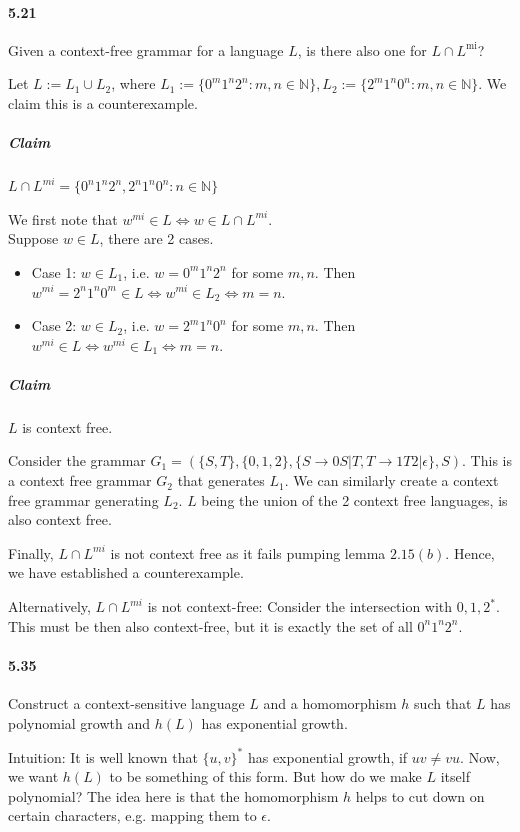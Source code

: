 \documentclass{article}
\begin{document}
\paragraph{5.21} Given a context-free grammar for a language $L$, is there also one for $L\cap L^{\text{mi}}$?

Let $L:=L_1\cup L_2$, where $L_1:=\{0^m1^n2^n:m,n\in \mathbb{N}\}, L_2:=\{2^m1^n0^n:m,n\in \mathbb{N}\}$. We claim this is a counterexample.

\subparagraph{Claim} $L\cap L^{mi}=\{0^n1^n2^n,2^n1^n0^n:n\in \mathbb{N}\}$

We first note that $w^{mi}\in L\iff w\in L\cap L^{mi}$.\\
Suppose $w\in L$, there are 2 cases.
\begin{itemize}
	\item Case 1: $w\in L_1$, i.e. $w=0^m1^n2^n$ for some $m,n$. Then $w^{mi}=2^n1^n0^m\in L\iff w^{mi}\in L_2\iff m=n$.
	\item Case 2: $w\in L_2$, i.e. $w=2^m1^n0^n$ for some $m,n$. Then $w^{mi}\in L\iff w^{mi}\in L_1\iff m=n$.
\end{itemize}


\subparagraph{Claim} $L$ is context free.

Consider the grammar $G_1 = (\{S,T\}, \{0,1,2\}, \{S\rightarrow 0S|T, T\rightarrow 1T2|\epsilon\}, S)$. This is a context free grammar $G_2$ that generates $L_1$. We can similarly create a context free grammar generating $L_2$. $L$ being the union of the 2 context free languages, is also context free.

Finally, $L\cap L^{mi}$ is not context free as it fails pumping lemma $2.15(b)$. Hence, we have established a counterexample. 

Alternatively, $L\cap L^{mi}$ is not context-free: Consider the intersection with ${0,1,2}^*$. This must be then also context-free, but it is exactly the set of all $0^n1^n2^n$.



\paragraph{5.35} Construct a context-sensitive language $L$ and a homomorphism $h$ such that $L$ has polynomial growth and $h(L)$ has exponential growth.

Intuition: It is well known that $\{u,v\}^*$ has exponential growth, if $uv\neq vu$. Now, we want $h(L)$ to be something of this form. But how do we make $L$ itself polynomial? The idea here is that the homomorphism $h$ helps to cut down on certain characters, e.g. mapping them to $\epsilon$.
\end{document}
